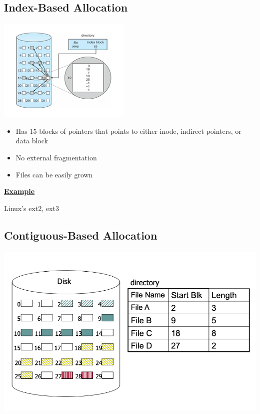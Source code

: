 \documentclass[12pt]{article}
\begin{document}
\subsection{Index-Based Allocation}
\begin{center}
\includegraphics[width=0.6\linewidth]{../images/midterm_4_solution_29.png}
\end{center}

\begin{itemize}
    \item Has 15 blocks of pointers that points to either inode, indirect pointers, or data block
    \item No external fragmentation
    \item Files can be easily grown
\end{itemize}

\bigskip

\underline{\textbf{Example}}

\bigskip

Linux's ext2, ext3

\subsection{Contiguous-Based Allocation}

\begin{center}
\includegraphics[width=\linewidth]{../images/midterm_2_solution_32.png}
\end{center}
\end{document}

